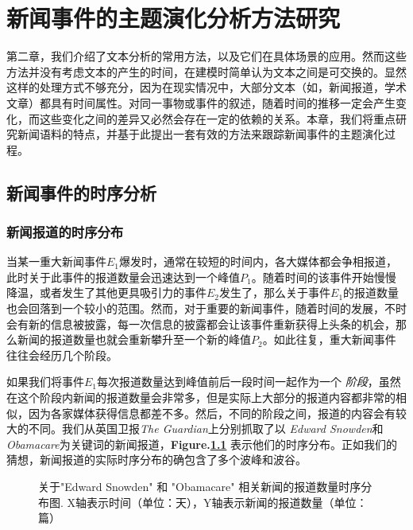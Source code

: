 \chapter{新闻事件的主题演化分析方法研究}
第二章，我们介绍了文本分析的常用方法，以及它们在具体场景的应用。然而这些方法并没有考虑文本的产生的时间，在建模时简单认为文本之间是可交换的。显然这样的处理方式不够充分，因为在现实情况中，大部分文本（如，新闻报道，学术文章）都具有时间属性。对同一事物或事件的叙述，随着时间的推移一定会产生变化，而这些变化之间的差异又必然会存在一定的依赖的关系。本章，我们将重点研究新闻语料的特点，并基于此提出一套有效的方法来跟踪新闻事件的主题演化过程。

\section{新闻事件的时序分析}
\subsection{新闻报道的时序分布}
当某一重大新闻事件$E_1$爆发时，通常在较短的时间内，各大媒体都会争相报道，此时关于此事件的报道数量会迅速达到一个峰值$P_1$。随着时间的该事件开始慢慢降温，或者发生了其他更具吸引力的事件$E_2$发生了，那么关于事件$E_1$的报道数量也会回落到一个较小的范围。然而，对于重要的新闻事件，随着时间的发展，不时会有新的信息被披露，每一次信息的披露都会让该事件重新获得上头条的机会，那么新闻的报道数量也就会重新攀升至一个新的峰值$P_2$。如此往复，重大新闻事件往往会经历几个阶段。

如果我们将事件$E_1$每次报道数量达到峰值前后一段时间一起作为一个 \emph{阶段}，虽然在这个阶段内新闻的报道数量会非常多，但是实际上大部分的报道内容都非常的相似，因为各家媒体获得信息都差不多。然后，不同的阶段之间，报道的内容会有较大的不同。我们从英国卫报\emph{The Guardian}上分别抓取了以 \emph{Edward Snowden}和\emph{Obamacare}为关键词的新闻报道，\textbf{Figure.\ref{temporal distribution}} 表示他们的时序分布。正如我们的猜想，新闻报道的实际时序分布的确包含了多个波峰和波谷。

\begin{figure}[htb]
	\caption{关于"Edward Snowden" 和 "Obamacare" 相关新闻的报道数量时序分布图. X轴表示时间（单位：天），Y轴表示新闻的报道数量（单位：篇）}
	\label{temporal distribution}
\end{figure}

